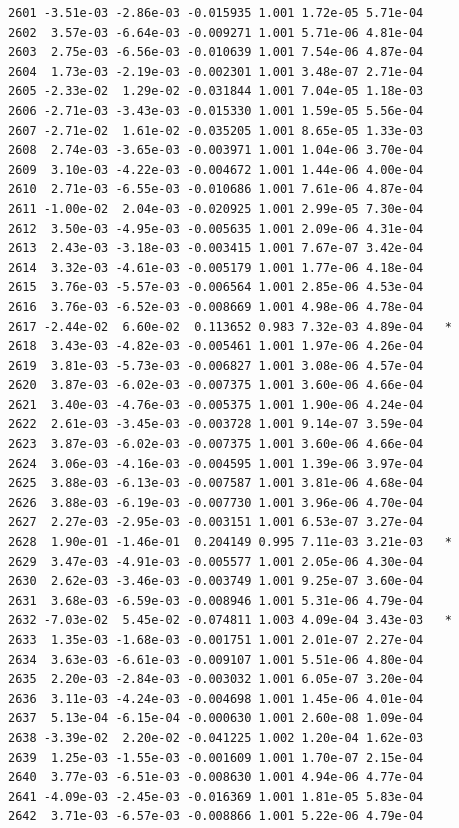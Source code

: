 \documentclass[
  letterpaper,
  DIV=11,
  numbers=noendperiod]{scrartcl}
\begin{document}
\begin{verbatim}
2601 -3.51e-03 -2.86e-03 -0.015935 1.001 1.72e-05 5.71e-04    
2602  3.57e-03 -6.64e-03 -0.009271 1.001 5.71e-06 4.81e-04    
2603  2.75e-03 -6.56e-03 -0.010639 1.001 7.54e-06 4.87e-04    
2604  1.73e-03 -2.19e-03 -0.002301 1.001 3.48e-07 2.71e-04    
2605 -2.33e-02  1.29e-02 -0.031844 1.001 7.04e-05 1.18e-03    
2606 -2.71e-03 -3.43e-03 -0.015330 1.001 1.59e-05 5.56e-04    
2607 -2.71e-02  1.61e-02 -0.035205 1.001 8.65e-05 1.33e-03    
2608  2.74e-03 -3.65e-03 -0.003971 1.001 1.04e-06 3.70e-04    
2609  3.10e-03 -4.22e-03 -0.004672 1.001 1.44e-06 4.00e-04    
2610  2.71e-03 -6.55e-03 -0.010686 1.001 7.61e-06 4.87e-04    
2611 -1.00e-02  2.04e-03 -0.020925 1.001 2.99e-05 7.30e-04    
2612  3.50e-03 -4.95e-03 -0.005635 1.001 2.09e-06 4.31e-04    
2613  2.43e-03 -3.18e-03 -0.003415 1.001 7.67e-07 3.42e-04    
2614  3.32e-03 -4.61e-03 -0.005179 1.001 1.77e-06 4.18e-04    
2615  3.76e-03 -5.57e-03 -0.006564 1.001 2.85e-06 4.53e-04    
2616  3.76e-03 -6.52e-03 -0.008669 1.001 4.98e-06 4.78e-04    
2617 -2.44e-02  6.60e-02  0.113652 0.983 7.32e-03 4.89e-04   *
2618  3.43e-03 -4.82e-03 -0.005461 1.001 1.97e-06 4.26e-04    
2619  3.81e-03 -5.73e-03 -0.006827 1.001 3.08e-06 4.57e-04    
2620  3.87e-03 -6.02e-03 -0.007375 1.001 3.60e-06 4.66e-04    
2621  3.40e-03 -4.76e-03 -0.005375 1.001 1.90e-06 4.24e-04    
2622  2.61e-03 -3.45e-03 -0.003728 1.001 9.14e-07 3.59e-04    
2623  3.87e-03 -6.02e-03 -0.007375 1.001 3.60e-06 4.66e-04    
2624  3.06e-03 -4.16e-03 -0.004595 1.001 1.39e-06 3.97e-04    
2625  3.88e-03 -6.13e-03 -0.007587 1.001 3.81e-06 4.68e-04    
2626  3.88e-03 -6.19e-03 -0.007730 1.001 3.96e-06 4.70e-04    
2627  2.27e-03 -2.95e-03 -0.003151 1.001 6.53e-07 3.27e-04    
2628  1.90e-01 -1.46e-01  0.204149 0.995 7.11e-03 3.21e-03   *
2629  3.47e-03 -4.91e-03 -0.005577 1.001 2.05e-06 4.30e-04    
2630  2.62e-03 -3.46e-03 -0.003749 1.001 9.25e-07 3.60e-04    
2631  3.68e-03 -6.59e-03 -0.008946 1.001 5.31e-06 4.79e-04    
2632 -7.03e-02  5.45e-02 -0.074811 1.003 4.09e-04 3.43e-03   *
2633  1.35e-03 -1.68e-03 -0.001751 1.001 2.01e-07 2.27e-04    
2634  3.63e-03 -6.61e-03 -0.009107 1.001 5.51e-06 4.80e-04    
2635  2.20e-03 -2.84e-03 -0.003032 1.001 6.05e-07 3.20e-04    
2636  3.11e-03 -4.24e-03 -0.004698 1.001 1.45e-06 4.01e-04    
2637  5.13e-04 -6.15e-04 -0.000630 1.001 2.60e-08 1.09e-04    
2638 -3.39e-02  2.20e-02 -0.041225 1.002 1.20e-04 1.62e-03    
2639  1.25e-03 -1.55e-03 -0.001609 1.001 1.70e-07 2.15e-04    
2640  3.77e-03 -6.51e-03 -0.008630 1.001 4.94e-06 4.77e-04    
2641 -4.09e-03 -2.45e-03 -0.016369 1.001 1.81e-05 5.83e-04    
2642  3.71e-03 -6.57e-03 -0.008866 1.001 5.22e-06 4.79e-04    

\end{verbatim}
\end{document}
